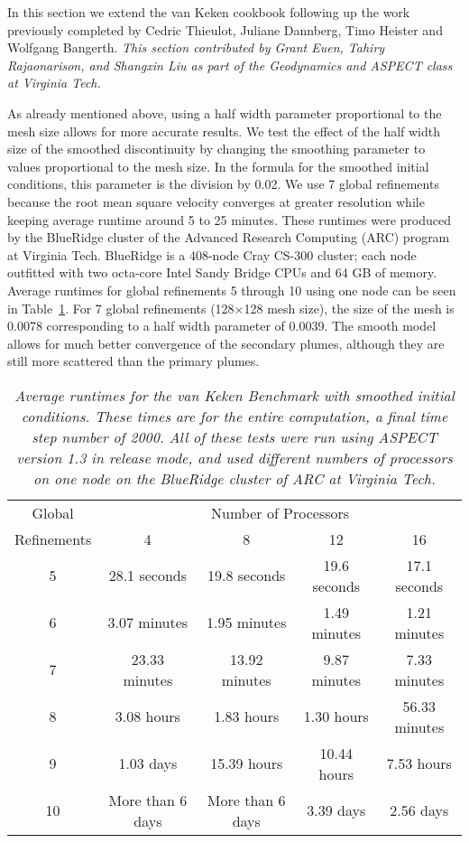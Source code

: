 \documentclass{article}
\begin{document}
In this section we extend the van Keken cookbook following up the work previously completed by Cedric Thieulot, Juliane Dannberg,
Timo Heister and Wolfgang Bangerth.  \textit{This section contributed by Grant Euen, Tahiry Rajaonarison, and Shangxin Liu as part of the Geodynamics and ASPECT class at Virginia Tech.}  

As already mentioned above, using a half width parameter proportional to the mesh size allows for more accurate results.  We test the effect of the half width size of the smoothed discontinuity by changing the smoothing parameter to values proportional to the mesh size.  In the formula for the smoothed initial conditions, this parameter is the division by 0.02.  We use 7 global refinements because the root mean square velocity converges at greater resolution while keeping average runtime around 5 to 25 minutes.  These runtimes were produced by the BlueRidge cluster of the Advanced Research Computing (ARC) program at Virginia Tech.  BlueRidge is a 408-node Cray CS-300 cluster; each node outfitted with two octa-core Intel Sandy Bridge CPUs and 64 GB of memory.  Average runtimes for global refinements 5 through 10 using one node can be seen in Table~\ref{tab:runtime-table}.  For 7 global refinements (128$\times$128 mesh size), the size of the mesh is 0.0078 corresponding to a half width parameter of 0.0039.  The smooth model allows for much better convergence of the secondary plumes, although they are still more scattered than the primary plumes.

\begin{table}[htb]
        \center
        \begin{tabular}{|c|cccc|}
                \hline
                Global & \multicolumn{4}{|c|}{Number of Processors} \\
                Refinements & 4 & 8 & 12 & 16
                \\ \hline
                5 & 28.1 seconds & 19.8 seconds & 19.6 seconds & 17.1 seconds \\
                6 & 3.07 minutes & 1.95 minutes & 1.49 minutes & 1.21 minutes \\
                7 & 23.33 minutes & 13.92 minutes & 9.87 minutes & 7.33 minutes \\
                8 & 3.08 hours & 1.83 hours & 1.30 hours & 56.33 minutes \\
                9 & 1.03 days & 15.39 hours & 10.44 hours & 7.53 hours \\
                10 & More than 6 days & More than 6 days & 3.39 days & 2.56 days \\ \hline
        \end{tabular}
        \caption{\it Average runtimes for the van Keken Benchmark with smoothed initial conditions.  These times are for the entire computation, a final time step number of 2000.  All of these tests were run using ASPECT version 1.3 in release mode, and used different numbers of processors on one node on the BlueRidge cluster of ARC at Virginia Tech.}
        \label{tab:runtime-table}
\end{table}
\end{document}

